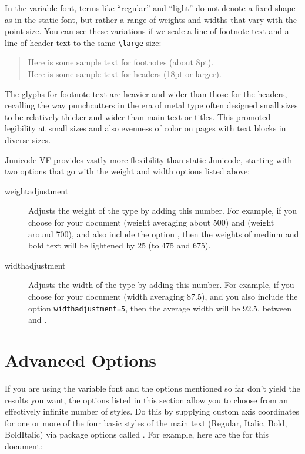 \noindent In the variable font, terms like “regular” and “light” do not denote a fixed shape as in the static font, but rather a
range of weights and widths that vary with the point size. You can see these variations
if we scale a line of footnote
text and a line of header text to the same {\color{BrickRed}\verb|\large|} size:

\begin{quote}
\large\samplefootnote Here is some sample text for footnotes (about 8pt).\\
\sampleheader Here is some sample text for headers (18pt or larger).
\end{quote}

\noindent The glyphs for footnote text are heavier and wider than those for the headers, recalling the way
punchcutters in the era of metal type often designed small sizes to be relatively thicker and wider
than main text or titles. This promoted legibility at small sizes and also evenness of color on
pages with text blocks in diverse sizes.

Junicode VF provides vastly more flexibility than static Junicode, starting with two options that go
with the weight and width options listed above:

\begin{description}
    \item[weightadjustment] Adjusts the weight of the type by adding this number.
    For example, if you choose  for your document (weight averaging about 500)
    and  (weight around 700), and also include the option ,
    then the weights of medium and bold text will be lightened by 25 (to 475 and 675).
    \item[widthadjustment] Adjusts the width of the type by adding this number. For example, if you
    choose  for your document (width averaging 87.5), and you also include
    the option {\color{BrickRed}\verb|widthadjustment=5|}, then the average width will be 92.5, between
     and .
\end{description}

\section{Advanced Options}

If you are using the variable font and the options mentioned so far don't yield the results
you want, the options listed in this section allow you to choose from an effectively infinite
number of styles. Do this by supplying custom axis coordinates for one or more of the four basic
styles of the main text (Regular, Italic, Bold, BoldItalic) via package options called
. For example, here are the  for this document:


